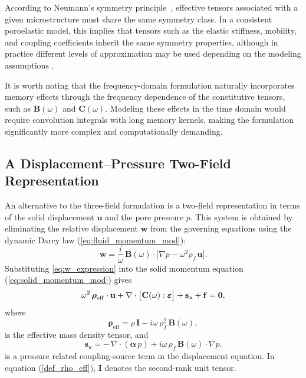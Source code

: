 \documentclass[pdflatex,sn-mathphys-num]{sn-jnl}
\theoremstyle{thmstyleone}%
\theoremstyle{thmstyletwo}%
\theoremstyle{thmstylethree}%
\theoremstyle{definition}
\begin{document}
	
	
	
	
	According to Neumann's symmetry principle~\cite{nye1985physical}, effective tensors associated with a given microstructure must share the same symmetry class. In a consistent poroelastic model, this implies that tensors such as the elastic stiffness, mobility, and coupling coefficients inherit the same symmetry properties, although in practice different levels of approximation may be used depending on the modeling assumptions \cite{jakobsen2009velocity}.
	
	
	
	
	It is worth noting that the frequency-domain formulation naturally incorporates memory effects through the frequency dependence of the constitutive tensors, such as \( \mathbf{B}(\omega) \) and \( \mathbf{C}(\omega) \). Modeling these effects in the time domain would require convolution integrals with long memory kernels, making the formulation significantly more complex and computationally demanding.
	

	\subsection{A Displacement--Pressure Two-Field Representation}
	
	An alternative to the three-field formulation is a two-field representation in terms of the solid displacement \( \mathbf{u} \) and the pore pressure \( p \). This system is obtained by eliminating the relative displacement \( \mathbf{w} \) from the governing equations using the dynamic Darcy law (\ref{eq:fluid_momentum_mod}):
	\begin{equation}
		\mathbf{w} = \frac{i}{\omega}\,\mathbf{B}(\omega)\cdot\big[\nabla p - \omega^2\rho_f\,\mathbf{u}\big].
		\label{eq:w_expression}
	\end{equation}
	Substituting \eqref{eq:w_expression} into the solid momentum 
	equation (\ref{eq:solid_momentum_mod}) gives 
	\begin{equation}
		\omega^2\,\boldsymbol{\rho}_{\mathrm{eff}}\cdot\mathbf{u} + \nabla\cdot\big[\mathbf{C}(\omega):\boldsymbol{\varepsilon}\big]
		+ \mathbf{s}_u + \mathbf{f} = {\bf 0},
		\label{displacement_eq}
	\end{equation}
	where 
	\begin{equation}
		\boldsymbol{\rho}_{\mathrm{eff}} = \rho\,\mathbf{I} - i\omega\,\rho_f^2\,\mathbf{B}(\omega),
		\label{def_rho_eff}
	\end{equation}
	is the effective mass density tensor, and
	\begin{equation*}
		\mathbf{s}_u = -\,\nabla\cdot(\boldsymbol{\alpha}\,p) + i\omega\,\rho_f\,\mathbf{B}(\omega)\cdot\nabla p.
	\end{equation*}
	is a pressure related coupling-source term in the displacement equation. 
	In equation (\ref{def_rho_eff}), $\mathbf{I}$ denotes the second-rank unit tensor. 
\end{document}
